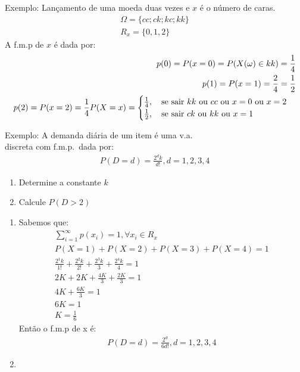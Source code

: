 \documentclass[11pt,a4paper]{book}
\begin{document}
\begin{enumerate}[label=(\alph*)]
\begin{enumerate}
\begin{enumerate}[label=(\alph*)]
    Exemplo: Lançamento de uma moeda duas vezes e $x$ é o número de caras.
    \begin{align}
      \Omega = \{ cc;ck;kc;kk \} \\
      R_{x}= \{0,1,2\}
    \end{align}
    A f.m.p de $x$ é dada por: 
    \begin{align}
      p(0)=P(x=0)=P(X(\omega)\in kk)=\frac{1}{4} \\
      p(1)=P(x=1)=\frac{2}{4}=\frac{1}{2}\\
      p(2)=P(x=2)=\frac{1}{4}
      P(X=x)= \begin{cases}
        \frac{1}{4}, \text{\quad se sair $kk$ ou $cc$ ou $x=0$ ou $x=2$}\\
        \frac{1}{2}, \text{\quad se sair $ck$ ou $kk$ ou $x=1$ }
      \end{cases}
    \end{align}
\end{enumerate}
Exemplo: A demanda diária de um item é uma v.a.\\ discreta com f.m.p.\ dada por: 
\begin{align}
  P(D=d)=\frac{2^d k}{d!}, d=1,2,3,4
\end{align}
\begin{enumerate}[label=(\alph*)]
  \item Determine a constante $k$
  \item Calcule $P(D>2)$
\end{enumerate}
\begin{enumerate}[label=(\alph*)]
  \item Sabemos que: 
    \begin{align}
      \sum^{\infty}_{i=1} p(x_i)=1, \forall x_i \in R_{x}\\
      P(X=1)+P(X=2)+P(X=3)+P(X=4)=1\\
      \frac{2^1 k}{1!}+\frac{2^2 k}{2!}+\frac{2^3 k}{3\!}+\frac{2^4 k}{4\!}=1\\
      2K + 2K+ \frac{4K}{3}+\frac{2K}{3}=1 \\
      4K+\frac{6K}{3}=1 \\
      6K=1\\
      K=\frac{1}{6}
    \end{align}
    Então o f.m.p de x é: 
    \begin{align}
      P(D=d)=\frac{2^d}{6d!}, d=1,2,3,4
    \end{align}
  \item 
    \begin{align}

\end{align}
\end{enumerate}
\end{enumerate}
\end{enumerate}
\end{document}
